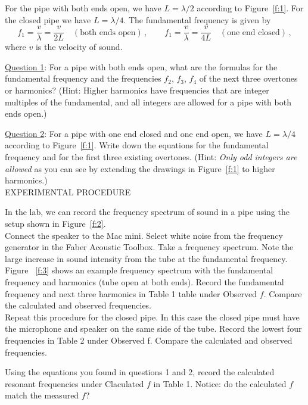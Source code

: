 \documentclass[11pt]{NSF}
\def\be{\begin{equation}}
\def\ee{\end{equation}}
\begin{document}
For the pipe with both ends open, we have $L = \lambda/2$ according to 
Figure~\ref{f:1}. 
For the closed pipe we have $L = \lambda/4$. 
The fundamental frequency is given by
%
\be
f_1 = \frac{v}{\lambda} = \frac{v}{2L}
\quad(\text{both ends open})\,,
\qquad
f_1 = \frac{v}{\lambda} = \frac{v}{4L} 
\quad(\text{one end closed})\,,
\ee
%
where $v$ is the velocity of sound.


\underline{Question 1}: For a pipe with both ends open, what are the formulas for the fundamental
frequency and the frequencies $f_2$, $f_3$, $f_4$ of the next three overtones or harmonics?
(Hint: Higher harmonics have frequencies that are integer multiples of the
fundamental, and all integers are allowed for a pipe with both ends open.)

\underline{Question 2}:
For a pipe with one end closed and one end open, we have $L = \lambda/4$ 
according to Figure~\ref{f:1}. 
Write down the equations for the fundamental frequency and for the
first three existing overtones. 
(Hint: {\em Only odd integers are allowed} as you can see by extending 
the drawings in Figure~\ref{f:1} to higher harmonics.) \\


EXPERIMENTAL PROCEDURE

In the lab, we can record the frequency spectrum of sound in a pipe
using the setup shown in Figure~\ref{f:2}. \\

Connect the speaker to the Mac mini. Select white noise from the frequency generator
in the Faber Acoustic Toolbox. Take a frequency spectrum. Note the large increase in sound intensity from the tube at the fundamental frequency. Figure ~\ref{f:3} shows an example frequency spectrum with the fundamental frequency and harmonics
(tube open at both ends). Record the fundamental frequency and next three harmonics in Table 1
table under Observed $f$. Compare the calculated and observed frequencies. \\

Repeat this procedure for the closed pipe. In this case the closed pipe must have the microphone
and speaker on the same side of the tube. Record the lowest four frequencies in Table 2 under
Observed f. Compare the calculated and observed frequencies.

Using the equations you found in questions 1 and 2, record the calculated resonant frequencies under Claculated $f$ in Table 1. Notice: do the calculated $f$ match the measured $f$?
\end{document}
